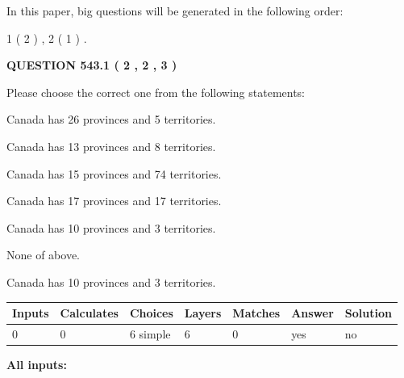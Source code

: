 \documentclass[12pt]{article}
\begin{document}
In this paper, big questions will be generated in the following order: 
   
   
   1 ( 2 )
 ,
   2 ( 1 )
 .
  
\vspace{0.2in}
  
{\textbf{\Large{QUESTION
543.1 
 ( 2 , 2 , 3 )
}}}
  
  
Please choose the correct one from the following statements:
 
 
Canada has  26 provinces and  5 territories.
 
 
Canada has  13 provinces and  8 territories.
 
 
Canada has  15 provinces and  74 territories.
 
 
Canada has  17 provinces and  17 territories.
 
 
Canada has 10  provinces and 3 territories.
 
 
 None of above.
 
 
\noindent{}
 
 
Canada has 10  provinces and 3 territories.
 
 
\noindent{}
 
 
   
   
   
   
\noindent\begin{tabular}{|l|l|l|l|l|l|l|}
 \hline
Inputs & Calculates & Choices & Layers & Matches & Answer & Solution \\ \hline
 0  & 
 0  & 
 6
  simple  
  & 
 6  & 
 0  & 
  yes & 
  no 
  \\ \hline
 \end{tabular}
   
   
   
   
\noindent{}
   
   
   
   
\noindent\vspace{0.1in}\hspace{-0.08in} {\textbf{\Large{All inputs: }}}
   
\end{document}
